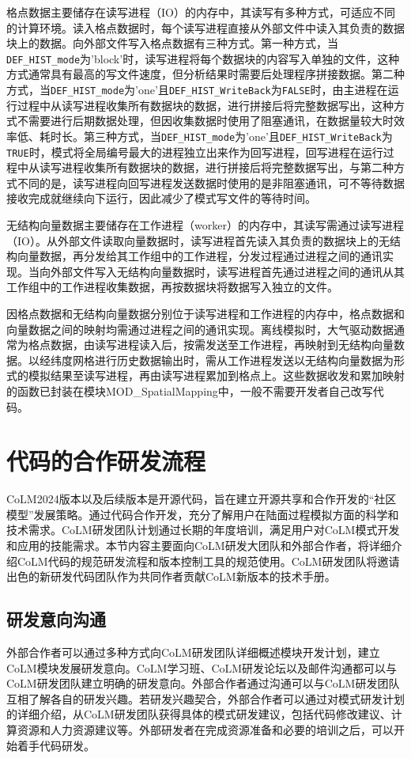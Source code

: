 格点数据主要储存在读写进程（IO）的内存中，其读写有多种方式，可适应不同的计算环境。读入格点数据时，每个读写进程直接从外部文件中读入其负责的数据块上的数据。向外部文件写入格点数据有三种方式。第一种方式，当\texttt{DEF\_HIST\_mode}为'block'时，读写进程将每个数据块的内容写入单独的文件，这种方式通常具有最高的写文件速度，但分析结果时需要后处理程序拼接数据。第二种方式，当\texttt{DEF\_HIST\_mode}为'one'且\texttt{DEF\_HIST\_WriteBack}为\texttt{FALSE}时，由主进程在运行过程中从读写进程收集所有数据块的数据，进行拼接后将完整数据写出，这种方式不需要进行后期数据处理，但因收集数据时使用了阻塞通讯，在数据量较大时效率低、耗时长。第三种方式，当\texttt{DEF\_HIST\_mode}为'one'且\texttt{DEF\_HIST\_WriteBack}为\texttt{TRUE}时，模式将全局编号最大的进程独立出来作为回写进程，回写进程在运行过程中从读写进程收集所有数据块的数据，进行拼接后将完整数据写出，与第二种方式不同的是，读写进程向回写进程发送数据时使用的是非阻塞通讯，可不等待数据接收完成就继续向下运行，因此减少了模式写文件的等待时间。

无结构向量数据主要储存在工作进程（worker）的内存中，其读写需通过读写进程（IO）。从外部文件读取向量数据时，读写进程首先读入其负责的数据块上的无结构向量数据，再分发给其工作组中的工作进程，分发过程通过进程之间的通讯实现。当向外部文件写入无结构向量数据时，读写进程首先通过进程之间的通讯从其工作组中的工作进程收集数据，再按数据块将数据写入独立的文件。

因格点数据和无结构向量数据分别位于读写进程和工作进程的内存中，格点数据和向量数据之间的映射均需通过进程之间的通讯实现。离线模拟时，大气驱动数据通常为格点数据，由读写进程读入后，按需发送至工作进程，再映射到无结构向量数据。以经纬度网格进行历史数据输出时，需从工作进程发送以无结构向量数据为形式的模拟结果至读写进程，再由读写进程累加到格点上。这些数据收发和累加映射的函数已封装在模块MOD\_SpatialMapping中，一般不需要开发者自己改写代码。

\section{代码的合作研发流程}

CoLM2024版本以及后续版本是开源代码，旨在建立开源共享和合作开发的“社区模型”发展策略。通过代码合作开发，充分了解用户在陆面过程模拟方面的科学和技术需求。CoLM研发团队计划通过长期的年度培训，满足用户对CoLM模式开发和应用的技能需求。本节内容主要面向CoLM研发大团队和外部合作者，将详细介绍CoLM代码的规范研发流程和版本控制工具的规范使用。CoLM研发团队将邀请出色的新研发代码团队作为共同作者贡献CoLM新版本的技术手册。

\subsection{研发意向沟通}
外部合作者可以通过多种方式向CoLM研发团队详细概述模块开发计划，建立CoLM模块发展研发意向。CoLM学习班、CoLM研发论坛以及邮件沟通都可以与CoLM研发团队建立明确的研发意向。外部合作者通过沟通可以与CoLM研发团队互相了解各自的研发兴趣。若研发兴趣契合，外部合作者可以通过对模式研发计划的详细介绍，从CoLM研发团队获得具体的模式研发建议，包括代码修改建议、计算资源和人力资源建议等。外部研发者在完成资源准备和必要的培训之后，可以开始着手代码研发。

